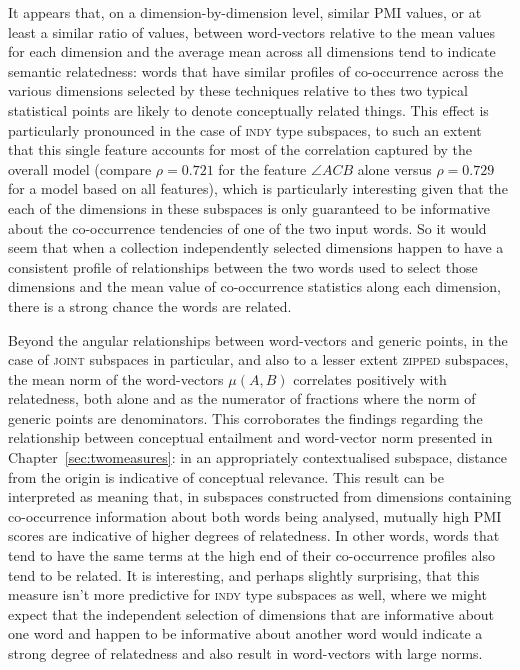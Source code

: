 It appears that, on a dimension-by-dimension level, similar PMI values, or at least a similar ratio of values, between word-vectors relative to the mean values for each dimension and the average mean across all dimensions tend to indicate semantic relatedness: words that have similar profiles of co-occurrence across the various dimensions selected by these techniques relative to thes two typical statistical points are likely to denote conceptually related things.  This effect is particularly pronounced in the case of \textsc{indy} type subspaces, to such an extent that this single feature accounts for most of the correlation captured by the overall model (compare $\rho = 0.721$ for the feature $\angle ACB$ alone versus $\rho = 0.729$ for a model based on all features), which is particularly interesting given that the each of the dimensions in these subspaces is only guaranteed to be informative about the co-occurrence tendencies of one of the two input words.  So it would seem that when a collection independently selected dimensions happen to have a consistent profile of relationships between the two words used to select those dimensions and the mean value of co-occurrence statistics along each dimension, there is a strong chance the words are related.

Beyond the angular relationships between word-vectors and generic points, in the case of \textsc{joint} subspaces in particular, and also to a lesser extent \textsc{zipped} subspaces, the mean norm of the word-vectors $\mu(A,B)$ correlates positively with relatedness, both alone and as the numerator of fractions where the norm of generic points are denominators.  This corroborates the findings regarding the relationship between conceptual entailment and word-vector norm presented in Chapter~\ref{sec:twomeasures}: in an appropriately contextualised subspace, distance from the origin is indicative of conceptual relevance.  This result can be interpreted as meaning that, in subspaces constructed from dimensions containing co-occurrence information about both words being analysed, mutually high PMI scores are indicative of higher degrees of relatedness.  In other words, words that tend to have the same terms at the high end of their co-occurrence profiles also tend to be related.  It is interesting, and perhaps slightly surprising, that this measure isn't more predictive for \textsc{indy} type subspaces as well, where we might expect that the independent selection of dimensions that are informative about one word and happen to be informative about another word would indicate a strong degree of relatedness and also result in word-vectors with large norms.

